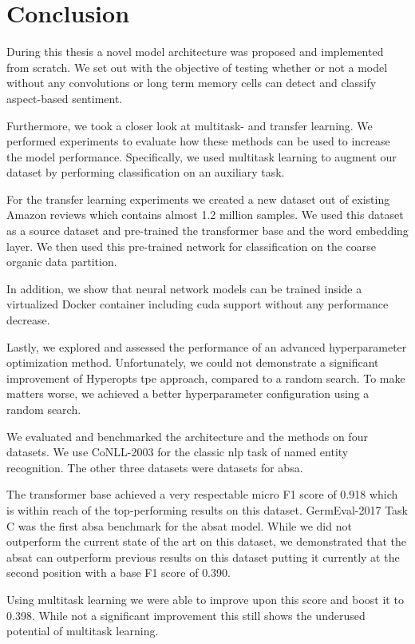\chapter{Conclusion}
\label{ch:conclusion}
During this thesis a novel model architecture was proposed and implemented from scratch. We set out with the objective of testing whether or not a model without any convolutions or long term memory cells can detect and classify aspect-based sentiment.
\medskip

Furthermore, we took a closer look at multitask- and transfer learning. We performed experiments to evaluate how these methods can be used to increase the model performance. Specifically, we used multitask learning to augment our dataset by performing classification on an auxiliary task. 
\smallskip

For the transfer learning experiments we created a new dataset out of existing Amazon reviews which contains almost 1.2 million samples. We used this dataset as a source dataset and pre-trained the transformer base and the word embedding layer. We then used this pre-trained network for classification on the coarse organic data partition.
\medskip

In addition, we show that neural network models can be trained inside a virtualized Docker container including \gls{cuda} support without any performance decrease. 
\medskip

Lastly, we explored and assessed the performance of an advanced hyperparameter optimization method. Unfortunately, we could not demonstrate a significant improvement of Hyperopts \gls{tpe} approach, compared to a random search. To make matters worse, we achieved a better hyperparameter configuration using a random search.
\bigskip

We evaluated and benchmarked the architecture and the methods on four datasets. We use CoNLL-2003 for the classic \gls{nlp} task of named entity recognition. The other three datasets were datasets for \gls{absa}.
\medskip

The transformer base achieved a very respectable micro F1 score of 0.918 which is within reach of the top-performing results on this dataset. GermEval-2017 Task C was the first \gls{absa} benchmark for the \gls{absat} model. While we did not outperform the current state of the art on this dataset, we demonstrated that the \gls{absat} can outperform previous results on this dataset putting it currently at the second position with a base F1 score of 0.390. 
\medskip

Using multitask learning we were able to improve upon this score and boost it to 0.398. While not a significant improvement this still shows the underused potential of multitask learning.
\medskip


